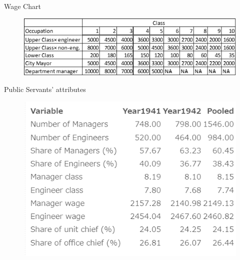 \begin{frame}{Wage Chart}
    \begin{figure}
        \centering
        \includegraphics[width=\textwidth]{Institutional Background/WageChart.png}
        \label{fig:enter-label}
    \end{figure}
\end{frame}



\begin{frame}{Public Servants' attributes}
    \begin{figure}
        \centering
        \includegraphics[width=\textwidth]{Institutional Background/UpperWorkerAttributes.png}
        \label{fig:enter-label}
    \end{figure}
\end{frame}








